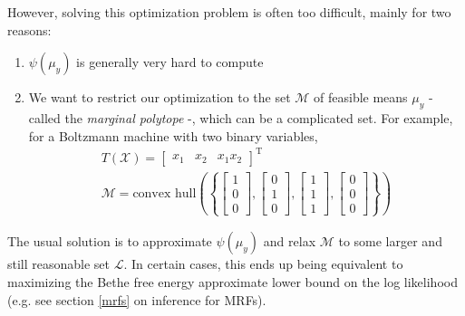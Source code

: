 \documentclass[a4paper]{article}
\begin{document}
However, solving this optimization problem is often too difficult, mainly for two reasons:
\begin{enumerate}
\item $\psi(\mu_y)$ is generally very hard to compute
\item We want to restrict our optimization to the set $\mathcal{M}$ of feasible means $\mu_y$ - called the \emph{marginal polytope} -, which can be a complicated set. For example, for a Boltzmann machine with two binary variables,
\begin{gather*}
T(\mathcal{X}) = \begin{bmatrix} x_1 & x_2 & x_1x_2 \end{bmatrix}^\textrm{T} \\
\mathcal{M} = \text{convex hull}\left( \left\{ \begin{bmatrix} 1 \\ 0 \\ 0 \end{bmatrix}, \begin{bmatrix} 0 \\ 1 \\ 0 \end{bmatrix}, \begin{bmatrix} 1 \\ 1 \\ 1 \end{bmatrix}, \begin{bmatrix} 0 \\ 0 \\ 0 \end{bmatrix} \right\} \right)
\end{gather*}
\end{enumerate}
The usual solution is to approximate $\psi(\mu_y)$ and relax $\mathcal{M}$ to some larger and still reasonable set $\mathcal{L}$. In certain cases, this ends up being equivalent to maximizing the Bethe free energy approximate lower bound on the log likelihood (e.g. see section \ref{mrfs} on inference for MRFs).

\end{document}
